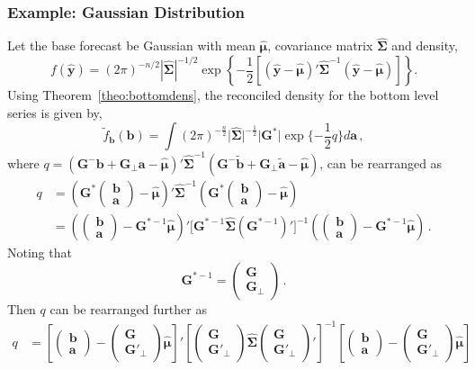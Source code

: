 \documentclass[12pt]{article}
\def\PQ{\begin{pmatrix}\bm{G}\\[-0.2cm]\bm{G}'_{\perp}\end{pmatrix}}
\def\bt{\begin{pmatrix}{\bm{b}}\\[-0.2cm]{\bm{a}}\end{pmatrix}}
\theoremstyle{definition}
\begin{document}
\subsubsection*{Example: Gaussian Distribution}

Let the base forecast be Gaussian with mean $\hat{\bm{\mu}}$, covariance matrix $\hat{\bm{\Sigma}}$ and density,
\begin{equation}
f(\hat{\bm{y}})=(2\pi)^{-n/2}|\hat{\bm{\Sigma}}|^{-1/2}\exp\left\{-\frac{1}{2}\left[(\hat{\bm{y}}-\hat{\bm{\mu}})'\hat{\bm{\Sigma}}^{-1}(\hat{\bm{y}}-\hat{\bm{\mu}})\right]\right\}\nonumber.
\end{equation}
Using Theorem~\ref{theo:bottomdens}, the reconciled density for the bottom level series is given by,
\begin{equation}
\tilde{f}_{\bm{b}}(\bm{b})=\int(2\pi)^{-\frac{n}{2}}\Big|\hat{\bm{\Sigma}}\Big|^{-\frac{1}{2}}\Big|\bm{G^*}|\exp\{-\frac{1}{2}q\}d{\bm a}\nonumber\,,
\end{equation}
where $q=(\bm{G}^-{\bm{b}}+\bm{G}_{\perp}{\bm{a}}-\hat{\bm{\mu}})' \hat{\bm{\Sigma}}^{-1}(\bm{G}^-\tilde{\bm{b}}+\bm{G}_\perp\tilde{\bm{a}}-\hat{\bm{\mu}})$, can be rearranged as
\begin{align*}
	q& =
	\left(\bm{G}^*\bt-\hat{\bm{\mu}}\right)' \hat{\bm{\Sigma}}^{-1}\left(\bm{G}^*\bt-\hat{\bm{\mu}}\right)\\
	& =
	\left(\bt-\bm{G}^{*-1}\hat{\bm{\mu}}\right)' \Big[\bm{G}^{*-1}\hat{\bm{\Sigma}}\left(\bm{G}^{*-1}\right)'\Big]^{-1}
	\left(\bt-\bm{G}^{*-1}\hat{\bm{\mu}}\right)\,.
\end{align*}
Noting that
\[
\bm{G}^{*-1} =
\begin{pmatrix}
\bm{G} \\\bm{G}_{\perp}
\end{pmatrix}\,.
\]
Then $q$ can be rearranged further as
\begin{align*}
	q& =%
	\left[\bt-\PQ\hat{\bm{\mu}}\right]'%
	\left[\PQ\hat{\bm{\Sigma}}\PQ'\right]^{-1}\left[\bt-\PQ\hat{\bm{\mu}}\right] %
\end{align*}
\end{document}
